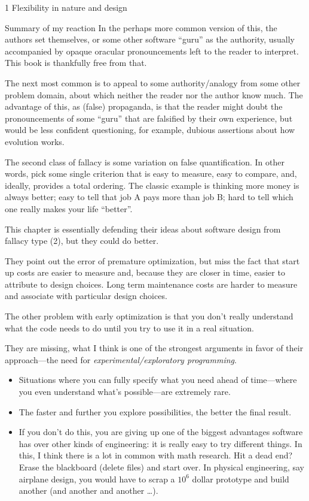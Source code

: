 \documentclass[11pt]{PalisadesLakesBook}
\begin{document}
\begin{plSection}{}
\begin{plSection}{1 Flexibility in nature and design}
\begin{plSection}{Summary of my reaction}
In the perhaps more common version of this, the authors set 
themselves, or some other software ``guru'' as the authority, 
usually accompanied by opaque oracular pronouncements 
left to the reader
to interpret.
This book is thankfully free from that.

The next most common is to appeal to some authority/analogy
from some other problem domain,
about which neither the reader nor the author know much.
The advantage of this, as (false) propaganda, 
is that the reader might doubt the pronouncements
of some ``guru'' that are falsified by their own experience,
but would be less confident questioning, for example,
dubious assertions about how evolution works.

The second class of fallacy is some variation on false 
quantification. 
In other words, pick some single criterion that is
easy to measure, easy to compare, and, ideally,
provides a total ordering. 
The classic example is thinking more money is always better;
easy to tell that job A pays more than job B;
hard to tell which one really makes your life ``better''.

This chapter is essentially defending their ideas about software
design from fallacy type (2),
but they could do better.

They point out the error of premature optimization,
but miss the fact that start up costs are easier to measure
and, because they are closer in time, easier to attribute to
design choices. 
Long term maintenance costs are harder to measure and
associate with particular design choices.

The other problem with early optimization is that you don't
really understand what the code needs to do until you try to
use it in a real situation.

They are missing, what I think is one of the strongest arguments
in favor of their approach---the need for 
\emph{experimental/exploratory programming}.
\begin{itemize}

  \item Situations where you can fully specify what you need
  ahead of time---where you even understand what's 
  possible---are extremely rare.

  \item The faster and further you explore possibilities,
  the better the final result.

  \item If you don't do this, you are giving up one of the
  biggest advantages software has over other kinds of engineering:
  it is really easy to try different things.
  In this, I think there is a lot in common with math research.
  Hit a dead end? Erase the blackboard (delete files) 
  and start over.
  In physical engineering, say airplane design, you would have
  to scrap a $10^{6}$ dollar prototype and build another
  (and another and another {\ldots}).
  

\end{itemize}
\end{plSection}
\end{plSection}
\end{plSection}
\end{document}
